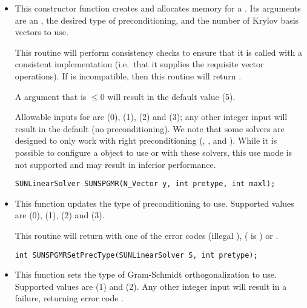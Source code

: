 \begin{itemize}


\item {}

  This constructor function creates and allocates memory for a {\spgmr}
  .  Its arguments are an {\nvector}, the desired
  type of preconditioning, and the number of Krylov basis vectors to use.

  This routine will perform consistency checks to ensure that it is
  called with a consistent {\nvector} implementation (i.e.~that it
  supplies the requisite vector operations).  If  is
  incompatible, then this routine will return .

  A  argument that is $\le0$ will result in the default
  value (5).

  Allowable inputs for  are  (0),
   (1),  (2) and  (3);
  any other integer input will result in the default (no
  preconditioning).  We note that some {\sundials} solvers are
  designed to only work with right preconditioning ({\kinsol}, {\ida}, and
  {\idas}).  While it is possible to configure a {\sunlinsolspgmr}
  object to use  or  with these solvers,
  this use mode is not supported and may result in inferior
  performance.

  \verb|SUNLinearSolver SUNSPGMR(N_Vector y, int pretype, int maxl);|


\item {}

  This function updates the type of preconditioning to use.  Supported
  values are  (0),  (1),
   (2) and  (3).  

  This routine will return with one of the error codes
   (illegal ), 
  ( is ) or .
  
  \verb|int SUNSPGMRSetPrecType(SUNLinearSolver S, int pretype);|


\item {}

  This function sets the type of Gram-Schmidt orthogonalization to
  use.  Supported values are  (1) and
   (2).  Any other integer input will result in a
  failure, returning error code .


\end{itemize}
